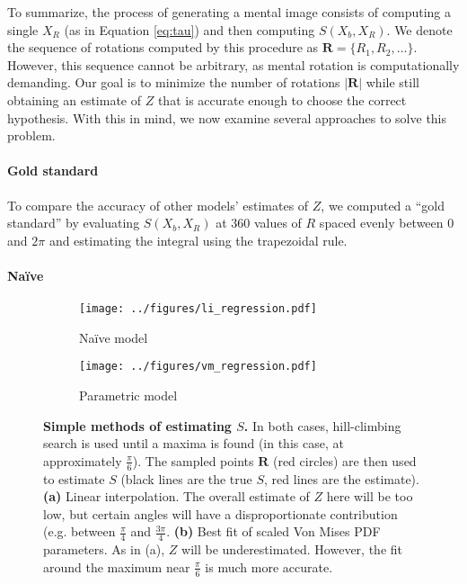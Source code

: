 \documentclass{article} %
\newcommand{\Naive}[0]{Na\"ive}
\begin{document}
To summarize, the process of generating a mental image consists of
computing a single $X_R$ (as in Equation \ref{eq:tau}) and then
computing $S(X_b, X_R)$. We denote the sequence of rotations computed
by this procedure as $\mathbf{R}=\{R_1, R_2, \ldots{}\}$. However,
this sequence cannot be arbitrary, as mental rotation is
computationally demanding. Our goal is to minimize the number of
rotations $\vert\mathbf{R}\vert$ while still obtaining an estimate of
$Z$ that is accurate enough to choose the correct hypothesis. With
this in mind, we now examine several approaches to solve this problem.

\paragraph{Gold standard}

To compare the accuracy of other models' estimates of $Z$, we computed
a ``gold standard'' by evaluating $S(X_b, X_R)$ at 360 values of $R$
spaced evenly between $0$ and $2\pi$ and estimating the integral using
the trapezoidal rule.

\paragraph{\Naive{}}

\begin{figure}[t]
  \centering
  \begin{subfigure}[b]{0.4\textwidth}
    \centering
    \texttt{[image: ../figures/li\_regression.pdf]}
    \caption{\Naive{} model}
    \label{fig:li}
  \end{subfigure}
  \begin{subfigure}[b]{0.4\textwidth}
    \centering
    \texttt{[image: ../figures/vm\_regression.pdf]}
    \caption{Parametric model}
    \label{fig:vm}
  \end{subfigure}
  \caption{\textbf{Simple methods of estimating $S$.} In both cases,
    hill-climbing search is used until a maxima is found (in this
    case, at approximately $\frac{\pi}{6}$). The sampled points
    $\mathbf{R}$ (red circles) are then used to estimate $S$ (black
    lines are the true $S$, red lines are the estimate). \textbf{(a)}
    Linear interpolation. The overall estimate of $Z$ here will be too
    low, but certain angles will have a disproportionate contribution
    (e.g. between $\frac{\pi}{4}$ and $\frac{3\pi}{4}$. \textbf{(b)}
    Best fit of scaled Von Mises PDF parameters. As in (a), $Z$ will
    be underestimated. However, the fit around the maximum near
    $\frac{\pi}{6}$ is much more accurate.}
  \label{fig:simple-models}
\end{figure}
\end{document}
